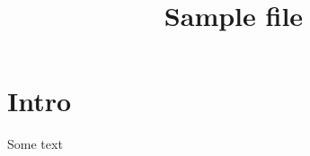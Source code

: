 \documentclass{article}
\title{Sample \tex file}
\begin{document}
\section{Intro}
Some text
\end{document}
